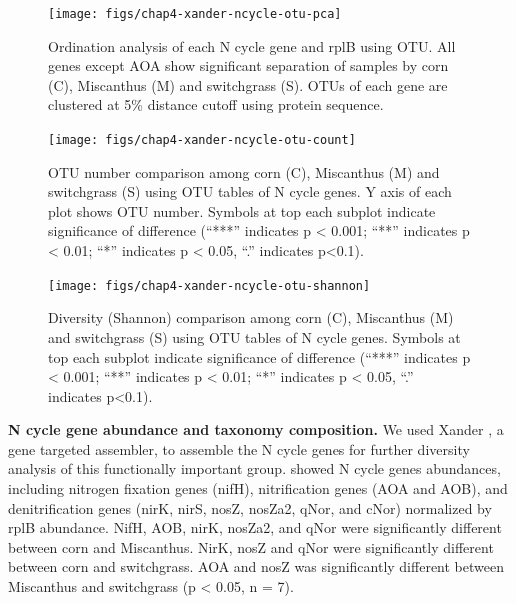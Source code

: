\documentclass[]{msu-thesis}
\begin{document}
\begin{figure}[tbph!]
  \centering
  \texttt{[image: figs/chap4-xander-ncycle-otu-pca]}
  \caption[Ordination analysis of each N cycle gene and rplB using OTU]{Ordination analysis of each N cycle gene and rplB using OTU. All genes except AOA show significant separation of samples by corn (C), Miscanthus (M) and switchgrass (S). OTUs of each gene are clustered at 5\% distance cutoff using protein sequence.}
  \label{fig:chap4Fig3}
\end{figure}


\begin{figure}[tbph!]
  \centering
  \texttt{[image: figs/chap4-xander-ncycle-otu-count]}
  \caption[N cycle gene OTU number comparison among three crops]{OTU number comparison among corn (C), Miscanthus (M) and switchgrass (S) using OTU tables of N cycle genes. Y axis of each plot shows OTU number. Symbols at top each subplot indicate significance of difference (``***'' indicates p < 0.001; ``**'' indicates p < 0.01; ``*'' indicates p < 0.05, ``.'' indicates p<0.1).}
  \label{fig:chap4FigS6}
\end{figure}


\begin{figure}[tbph!]
  \centering
  \texttt{[image: figs/chap4-xander-ncycle-otu-shannon]}
  \caption[N cycle gene diversity of three crops]{Diversity (Shannon) comparison among corn (C), Miscanthus (M) and switchgrass (S) using OTU tables of N cycle genes. Symbols at top each subplot indicate significance of difference (``***'' indicates p < 0.001; ``**'' indicates p < 0.01; ``*'' indicates p < 0.05, ``.'' indicates p<0.1).}
  \label{fig:chap4FigS7}
\end{figure}


\textbf{N cycle gene abundance and taxonomy composition. }
We used Xander \cite{wang_xander:_2015}, a gene targeted assembler, to assemble the N cycle genes for further diversity analysis of this functionally important group.  showed N cycle genes abundances, including nitrogen fixation genes (nifH), nitrification genes (AOA and AOB), and denitrification genes (nirK, nirS, nosZ, nosZa2, qNor, and cNor) normalized by rplB abundance. NifH, AOB, nirK, nosZa2, and qNor were significantly different between corn and Miscanthus. NirK, nosZ and qNor were significantly different between corn and switchgrass. AOA and nosZ was significantly different between Miscanthus and switchgrass (p < 0.05, n = 7).
\end{document}
